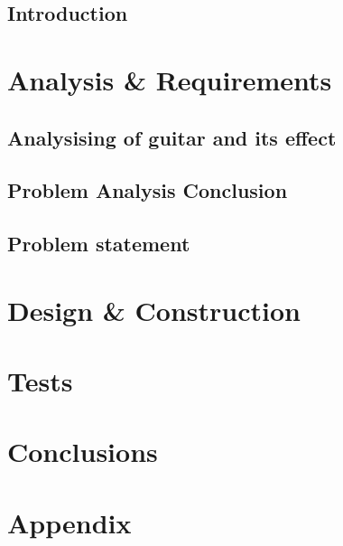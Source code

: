 \glsresetall
 \graphicspath{{figures/analysing/}}
\chapter{Introduction}

\part{Analysis \& Requirements}\label{pt:analysis} \glsresetall
 \graphicspath{{figures/analysing/}}
 \chapter{Analysising of guitar and its effect}\label{ch:analysing}
 

\label{sec:platform_comparing}

 \label{sec:FPGA}

 \label{sec:digital_vs_analog}

\chapter{Problem Analysis Conclusion}



\chapter{Problem statement}




\part{Design \& Construction}\label{pt:design} 
 
%
\part{Tests}\label{pt:tests} 
\part{Conclusions}\label{pt:conclusions} 
%

\glsresetall
 \graphicspath{{figures/appendix/}}
\part{Appendix}\label{pt:appendix}


